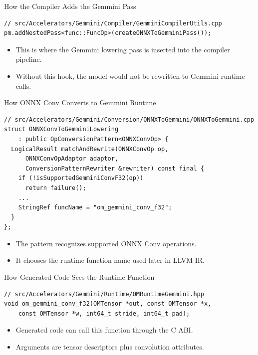 \documentclass[aspectratio=169,10pt]{beamer}
\begin{document}
\begin{frame}[fragile]{How the Compiler Adds the Gemmini Pass}
  \begin{lstlisting}
// src/Accelerators/Gemmini/Compiler/GemminiCompilerUtils.cpp
pm.addNestedPass<func::FuncOp>(createONNXToGemminiPass());
  \end{lstlisting}
  \begin{itemize}
    \item This is where the Gemmini lowering pass is inserted into the compiler pipeline.
    \item Without this hook, the model would not be rewritten to Gemmini runtime calls.
  \end{itemize}
\end{frame}

\begin{frame}[fragile]{How ONNX Conv Converts to Gemmini Runtime}
  \begin{lstlisting}
// src/Accelerators/Gemmini/Conversion/ONNXToGemmini/ONNXToGemmini.cpp
struct ONNXConvToGemminiLowering
    : public OpConversionPattern<ONNXConvOp> {
  LogicalResult matchAndRewrite(ONNXConvOp op,
      ONNXConvOpAdaptor adaptor,
      ConversionPatternRewriter &rewriter) const final {
    if (!isSupportedGemminiConvF32(op))
      return failure();
    ...
    StringRef funcName = "om_gemmini_conv_f32";
  }
};
  \end{lstlisting}
  \begin{itemize}
    \item The pattern recognizes supported ONNX Conv operations.
    \item It chooses the runtime function name used later in LLVM IR.
  \end{itemize}
\end{frame}

\begin{frame}[fragile]{How Generated Code Sees the Runtime Function}
  \begin{lstlisting}
// src/Accelerators/Gemmini/Runtime/OMRuntimeGemmini.hpp
void om_gemmini_conv_f32(OMTensor *out, const OMTensor *x,
    const OMTensor *w, int64_t stride, int64_t pad);
  \end{lstlisting}
  \begin{itemize}
    \item Generated code can call this function through the C ABI.
    \item Arguments are tensor descriptors plus convolution attributes.
  \end{itemize}
\end{frame}
\end{document}
